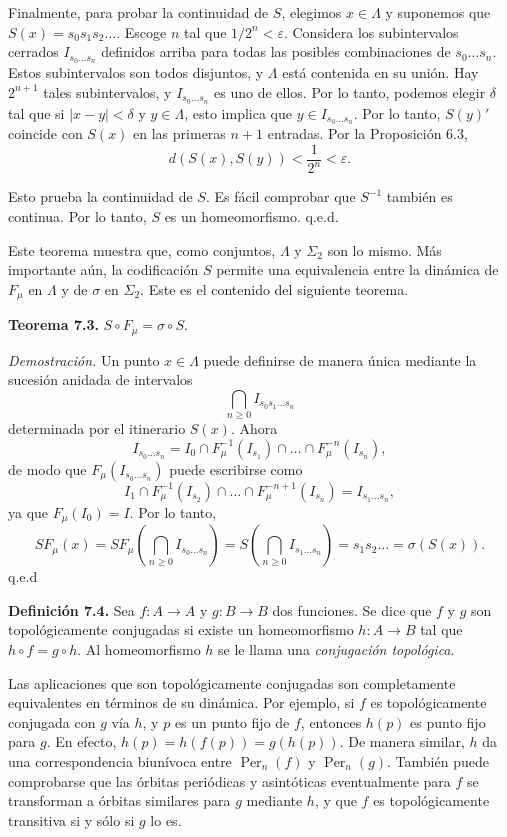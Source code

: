 \documentclass[10pt,a4paper]{book}
\begin{document}
Finalmente, para probar la continuidad de $S$, elegimos $x \in \Lambda$ y suponemos que $S(x) = s_0 s_1 s_2 \dots$. Escoge $n$ tal que $1/2^n < \varepsilon$. Considera los subintervalos cerrados $I_{s_0 \dots s_n}$ definidos arriba para todas las posibles combinaciones de $s_0 \dots s_n$. Estos subintervalos son todos disjuntos, y $\Lambda$ está contenida en su unión. Hay $2^{n+1}$ tales subintervalos, y $I_{s_0 \dots s_n}$ es uno de ellos. Por lo tanto, podemos elegir $\delta$ tal que si $|x - y| < \delta$ y $y \in \Lambda$, esto implica que $y \in I_{s_0 \dots s_n}$. Por lo tanto, $S(y)'$ coincide con $S(x)$ en las primeras $n+1$ entradas. Por la Proposición 6.3,
\[
d(S(x), S(y)) < \frac{1}{2^n} < \varepsilon.
\]

Esto prueba la continuidad de $S$. Es fácil comprobar que $S^{-1}$ también es continua. Por lo tanto, $S$ es un homeomorfismo.
\hfill q.e.d.

Este teorema muestra que, como conjuntos, $\Lambda$ y $\Sigma_2$ son lo mismo. Más importante aún, la codificación $S$ permite una equivalencia entre la dinámica de $F_\mu$ en $\Lambda$ y de $\sigma$ en $\Sigma_2$. Este es el contenido del siguiente teorema.

\textbf{Teorema 7.3.} $S \circ F_\mu = \sigma \circ S$.

\textit{Demostración.} Un punto $x \in \Lambda$ puede definirse de manera única mediante la sucesión anidada de intervalos
\[
\bigcap_{n \geq 0} I_{s_0 s_1 \dots s_n}
\]
determinada por el itinerario $S(x)$. Ahora
\[
I_{s_0 \dots s_n} = I_0 \cap F_\mu^{-1}(I_{s_1}) \cap \dots \cap F_\mu^{-n}(I_{s_n}),
\]
de modo que $F_\mu(I_{s_0 \dots s_n})$ puede escribirse como
\[
I_1 \cap F_\mu^{-1}(I_{s_2}) \cap \dots \cap F_\mu^{-n+1}(I_{s_n}) = I_{s_1 \dots s_n},
\]
ya que $F_\mu(I_0) = I$. Por lo tanto,
\[
S F_\mu(x) = S F_\mu \left( \bigcap_{n \geq 0} I_{s_0 \dots s_n} \right) = S \left( \bigcap_{n \geq 0} I_{s_1 \dots s_n} \right) = s_1 s_2 \dots = \sigma(S(x)).
\]
\hfill q.e.d

\textbf{Definición 7.4.} Sea $f : A \to A$ y $g : B \to B$ dos funciones. Se dice que $f$ y $g$ son topológicamente conjugadas si existe un homeomorfismo $h : A \to B$ tal que $h \circ f = g \circ h$. Al homeomorfismo $h$ se le llama una \textit{conjugación topológica}.

Las aplicaciones que son topológicamente conjugadas son completamente equivalentes en términos de su dinámica. Por ejemplo, si $f$ es topológicamente conjugada con $g$ vía $h$, y $p$ es un punto fijo de $f$, entonces $h(p)$ es punto fijo para $g$. En efecto, $h(p) = h(f(p)) = g(h(p))$. De manera similar, $h$ da una correspondencia biunívoca entre $\operatorname{Per}_n(f)$ y $\operatorname{Per}_n(g)$. También puede comprobarse que las órbitas periódicas y asintóticas eventualmente para $f$ se transforman a órbitas similares para $g$ mediante $h$, y que $f$ es topológicamente transitiva si y sólo si $g$ lo es. 
\end{document}
